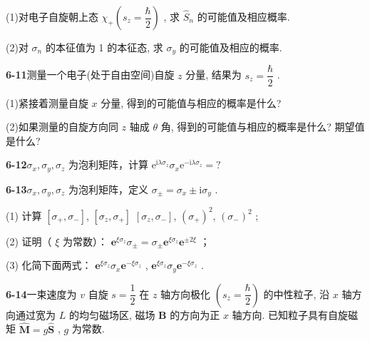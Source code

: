 (1)对电子自旋朝上态 $\displaystyle \chi_{+}(s_{z} = \dfrac{\hbar}{2})$ , 求 $\displaystyle \hat{S}_n$ 的可能值及相应概率.

(2)对 $\displaystyle \sigma_{n}$ 的本征值为 1 的本征态, 求 $\displaystyle \sigma_{y}$ 的可能值及相应的概率.

\vfill

\newpage

\textbf{6-11}\quad 测量一个电子(处于自由空间)自旋 $\displaystyle z$ 分量, 结果为 $\displaystyle s_z = \dfrac{\hbar}{2}$ .

(1)紧接着测量自旋 $\displaystyle x$ 分量, 得到的可能值与相应的概率是什么?

(2)如果测量的自旋方向同 $\displaystyle z$ 轴成 $\displaystyle \theta$ 角, 得到的可能值与相应的概率是什么? 期望值是什么?

\vfill

\newpage

\textbf{6-12}\quad $\displaystyle \sigma_{x},\sigma_{y},\sigma_{z}$ 为泡利矩阵，计算 $\displaystyle \mathrm{e}^{\mathrm{i}\lambda \sigma_z}\sigma_x\mathrm{e}^{-\mathrm{i}\lambda \sigma_z} = ?$

\vfill

\newpage

\textbf{6-13}\quad $\displaystyle \sigma_{x},\sigma_{y},\sigma_{z}$ 为泡利矩阵，定义 $\displaystyle \sigma_{\pm} = \sigma_{x}\pm \mathrm{i}\sigma_{y}$ .

(1) 计算 $\displaystyle [\sigma_+, \sigma_-]$, $\displaystyle [\sigma_z, \sigma_+]$ $\displaystyle \left[\sigma_z,\sigma_-\right]$, $\displaystyle (\sigma_+) ^2$, $\displaystyle (\sigma_-)^2$ ;

(2) 证明（ $\displaystyle \xi$ 为常数）： $\displaystyle \mathbf{e}^{\xi \sigma_z}\sigma_{\pm} = \sigma_{\pm}\mathbf{e}^{\xi \sigma_z}\mathbf{e}^{\pm 2\xi}$ ；

(3) 化简下面两式： $\displaystyle \mathbf{e}^{\xi \sigma_z}\sigma_x\mathbf{e}^{-\xi \sigma_z}$ , $\displaystyle \mathbf{e}^{\xi \sigma_z}\sigma_y\mathbf{e}^{-\xi \sigma_z}$ .

\vfill

\newpage

\textbf{6-14}\quad 一束速度为 $\displaystyle v$ 自旋 $\displaystyle s = \dfrac{1}{2}$ 在 $\displaystyle z$ 轴方向极化 $\displaystyle (s_z = \dfrac{\hbar}{2})$ 的中性粒子, 沿 $\displaystyle x$ 轴方向通过宽为 $\displaystyle L$ 的均匀磁场区, 磁场 $\displaystyle \pmb{B}$ 的方向为正 $\displaystyle x$ 轴方向. 已知粒子具有自旋磁矩 $\displaystyle \hat{\pmb{M}} = g\hat{\pmb{S}}$ , $\displaystyle g$ 为常数.

